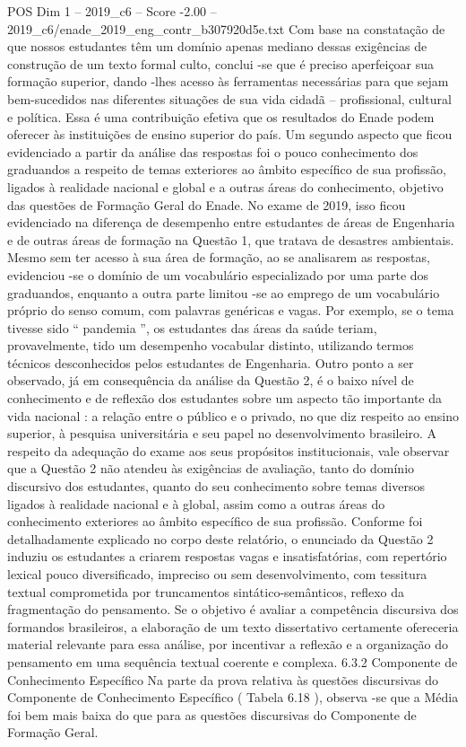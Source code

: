 \begin{textsample}{POS Dim 1 – 2019\_c6 – Score -2.00 – 2019\_c6/enade\_2019\_eng\_contr\_b307920d5e.txt}
Com base na constatação de que nossos estudantes têm um domínio apenas mediano dessas exigências de construção de um texto formal culto, conclui -se que é preciso aperfeiçoar sua formação superior, dando -lhes acesso às ferramentas necessárias para que sejam bem-sucedidos nas diferentes situações de sua vida cidadã – profissional, cultural e política.
Essa é uma contribuição efetiva que os resultados do Enade podem oferecer às instituições de ensino superior do país.
Um segundo aspecto que ficou evidenciado a partir da análise das respostas foi o pouco conhecimento dos graduandos a respeito de temas exteriores ao âmbito específico de sua profissão, ligados à realidade nacional e global e a outras áreas do conhecimento, objetivo das questões de Formação Geral do Enade.
No exame de 2019, isso ficou evidenciado na diferença de desempenho entre estudantes de áreas de Engenharia e de outras áreas de formação na Questão 1, que tratava de desastres ambientais.
Mesmo sem ter acesso à sua área de formação, ao se analisarem as respostas, evidenciou -se o domínio de um vocabulário especializado por uma parte dos graduandos, enquanto a outra parte limitou -se ao emprego de um vocabulário próprio do senso comum, com palavras genéricas e vagas.
Por exemplo, se o tema tivesse sido “ pandemia ”, os estudantes das áreas da saúde teriam, provavelmente, tido um desempenho vocabular distinto, utilizando termos técnicos desconhecidos pelos estudantes de Engenharia.
Outro ponto a ser observado, já em consequência da análise da Questão 2, é o baixo nível de conhecimento e de reflexão dos estudantes sobre um aspecto tão importante da vida nacional : a relação entre o público e o privado, no que diz respeito ao ensino superior, à pesquisa universitária e seu papel no desenvolvimento brasileiro.
A respeito da adequação do exame aos seus propósitos institucionais, vale observar que a Questão 2 não atendeu às exigências de avaliação, tanto do domínio discursivo dos estudantes, quanto do seu conhecimento sobre temas diversos ligados à realidade nacional e à global, assim como a outras áreas do conhecimento exteriores ao âmbito específico de sua profissão.
Conforme foi detalhadamente explicado no corpo deste relatório, o enunciado da Questão 2 induziu os estudantes a criarem respostas vagas e insatisfatórias, com repertório lexical pouco diversificado, impreciso ou sem desenvolvimento, com tessitura textual comprometida por truncamentos sintático-semânticos, reflexo da fragmentação do pensamento.
Se o objetivo é avaliar a competência discursiva dos formandos brasileiros, a elaboração de um texto dissertativo certamente ofereceria material relevante para essa análise, por incentivar a reflexão e a organização do pensamento em uma sequência textual coerente e complexa. 6.3.2 Componente de Conhecimento Específico Na parte da prova relativa às questões discursivas do Componente de Conhecimento Específico ( Tabela 6.18 ), observa -se que a Média foi bem mais baixa do que para as questões discursivas do Componente de Formação Geral.

\end{textsample}
